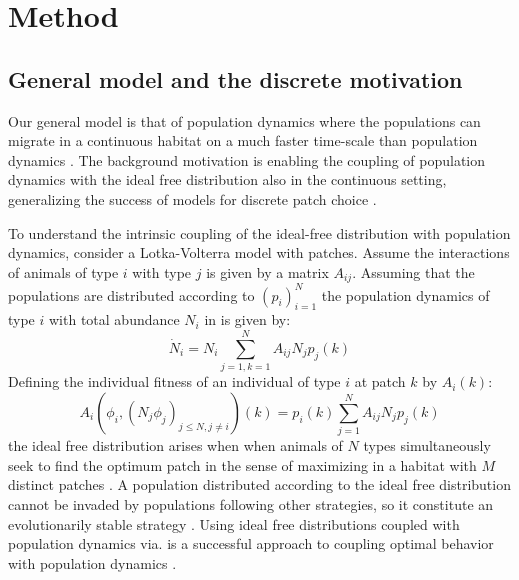 \section{Method}


\subsection*{General model and the discrete motivation}

Our general model is that of population dynamics where the populations can migrate in a continuous habitat on a much faster time-scale than population dynamics \citep{cressman2006migration}. The background motivation is enabling the coupling of population dynamics with the ideal free distribution also in the continuous setting, generalizing the success of models for discrete patch choice \citep{valdovinos2010consequences}.

To understand the intrinsic coupling of the ideal-free distribution with population dynamics,
consider a Lotka-Volterra model with patches. Assume the interactions of animals of type $i$ with type $j$ is given by a matrix $A_{ij}$. Assuming that the populations are distributed according to $(p_i)_{i=1}^N$ the population dynamics of type $i$ with total abundance $N_i$ in is given by:
\begin{equation}
  \dot{N}_i = N_i\sum_{j=1,k=1}^N {A_{ij}N_j p_j}(k) %
  \label{eq:utility_pm}
\end{equation}
Defining the individual fitness of an individual of type $i$ at patch $k$ by $A_i(k)$:
\begin{equation}
  A_i(\phi_i, (N_j \phi_j)_{j \leq N, j \neq i})(k) = p_i(k) \sum_{j=1}^N {A_{ij}N_j p_j}(k) %
  \label{eq:utility_pm}
\end{equation}
the ideal free distribution arises when when animals of $N$ types simultaneously seek to find the optimum patch in the sense of maximizing  in a habitat with $M$ distinct patches \citep{cressman2004ideal}. A population distributed according to the ideal free distribution cannot be invaded by populations following other strategies, so it constitute an evolutionarily stable strategy \citep{cressman2010ideal}. Using ideal free distributions coupled with population dynamics via.  is a successful approach to coupling optimal behavior with population dynamics \citep{kvrivan2008ideal,morris2020time,mougi2019adaptive}.

